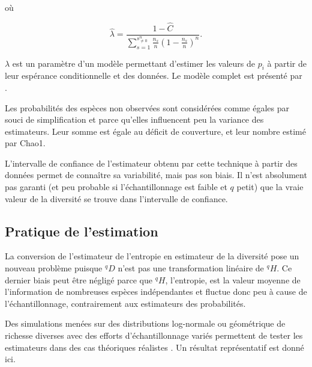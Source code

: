 \documentclass[
  11pt,
  french,
  a4paper,
  extrafontsizes,onecolumn,openright
  ]{memoir}
\begin{document}
où

\begin{equation}
  \label{eq:Chao2013lambda}
  \hat{\lambda}
  = \frac{1-\hat{C}}{\sum_{s=1}^{s^{n}_{\ne 0}} {\frac{n_s}{n} \left(1-\frac{n_s}{n}\right)^n}}.
\end{equation}

\(\lambda\) est un paramètre d'un modèle permettant d'estimer les valeurs de \(p_i\) à partir de leur espérance conditionnelle et des données.
Le modèle complet est présenté par \textcite{Chao2014c}.

Les probabilités des espèces non observées sont considérées comme égales par souci de simplification et parce qu'elles influencent peu la variance des estimateurs.
Leur somme est égale au déficit de couverture, et leur nombre estimé par Chao1.

L'intervalle de confiance de l'estimateur obtenu par cette technique à partir des données permet de connaître sa variabilité, mais pas son biais.
Il n'est absolument pas garanti (et peu probable si l'échantillonnage est faible et \(q\) petit) que la vraie valeur de la diversité se trouve dans l'intervalle de confiance.

\hypertarget{pratique-de-lestimation}{%
\subsection{Pratique de l'estimation}\label{pratique-de-lestimation}}

La conversion de l'estimateur de l'entropie en estimateur de la diversité pose un nouveau problème puisque \(^{q}\!D\) n'est pas une transformation linéaire de \(^{q}\!H\).
Ce dernier biais peut être négligé \autocite{Grassberger1988} parce que \(^{q}\!H\), l'entropie, est la valeur moyenne de l'information de nombreuses espèces indépendantes et fluctue donc peu à cause de l'échantillonnage, contrairement aux estimateurs des probabilités.

Des simulations menées sur des distributions log-normale ou géométrique de richesse diverses avec des efforts d'échantillonnage variés permettent de tester les estimateurs dans des cas théoriques réalistes \autocite{Marcon2015a}.
Un résultat représentatif est donné ici.



\scriptsize
\end{document}
